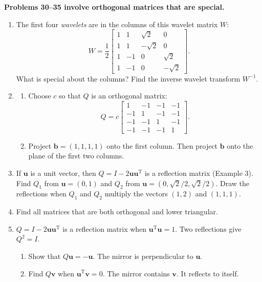 \documentclass[14pt, a4paper]{article}
\begin{document}
\noindent \textbf{Problems 30--35 involve orthogonal matrices that are special.}

\begin{enumerate}[resume]
    \item The first four \emph{wavelets} are in the columns of this wavelet matrix $W$:
          \[
              W = \frac{1}{2} \begin{bmatrix} 1 & 1 & \sqrt{2} & 0 \\ 1 & 1 & -\sqrt{2} & 0 \\ 1 & -1 & 0 & \sqrt{2} \\ 1 & -1 & 0 & -\sqrt{2} \end{bmatrix}.
          \]
          What is special about the columns? Find the inverse wavelet transform $W^{-1}$.

    \item
          \begin{enumerate}
              \item Choose $c$ so that $Q$ is an orthogonal matrix:
                    \[
                        Q = c \begin{bmatrix} 1 & -1 & -1 & -1 \\ -1 & 1 & -1 & -1 \\ -1 & -1 & 1 & -1 \\ -1 & -1 & -1 & 1 \end{bmatrix}.
                    \]
              \item Project $\boldsymbol{b} = (1, 1, 1, 1)$ onto the first column. Then project $\boldsymbol{b}$ onto the plane of the first two columns.
          \end{enumerate}

    \item If $\boldsymbol{u}$ is a unit vector, then $Q = I - 2\boldsymbol{u}\boldsymbol{u}^{\mathrm{T}}$ is a reflection matrix (Example 3). Find $Q_1$ from $\boldsymbol{u} = (0, 1)$ and $Q_2$ from $\boldsymbol{u} = (0, \sqrt{2}/2, \sqrt{2}/2)$. Draw the reflections when $Q_1$ and $Q_2$ multiply the vectors $(1, 2)$ and $(1, 1, 1)$.

    \item Find all matrices that are both orthogonal and lower triangular.

    \item $Q = I - 2\boldsymbol{u}\boldsymbol{u}^{\mathrm{T}}$ is a reflection matrix when $\boldsymbol{u}^{\mathrm{T}}\boldsymbol{u} = 1$. Two reflections give $Q^2 = I$.
          \begin{enumerate}
              \item Show that $Q\boldsymbol{u} = -\boldsymbol{u}$. The mirror is perpendicular to $\boldsymbol{u}$.
              \item Find $Q\boldsymbol{v}$ when $\boldsymbol{u}^{\mathrm{T}}\boldsymbol{v} = 0$. The mirror contains $\boldsymbol{v}$. It reflects to itself.
          \end{enumerate}
\end{enumerate}
\end{document}
